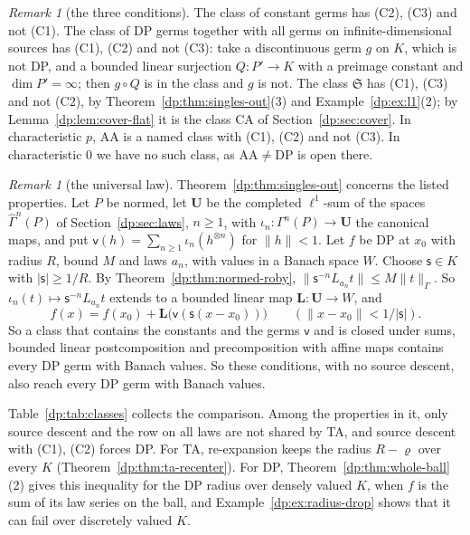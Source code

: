 \documentclass[11pt]{amsart}
\theoremstyle{definition}
\theoremstyle{remark}
\newtheorem{remark}[theorem]{Remark}
\numberwithin{equation}{section}
\newcommand{\abs}[1]{\lvert #1\rvert}
\newcommand{\norm}[1]{\lVert #1\rVert}
\theoremstyle{plain}
\theoremstyle{definition}
\theoremstyle{plain}
\newcommand{\hGamma}{\widehat\Gamma}
\begin{document}
\begin{remark}[the three conditions]\label{dp:rem:conditions}
The class of constant germs has (C2), (C3) and not (C1). The class of DP germs together with all germs on infinite-dimensional sources has (C1), (C2) and not (C3): take a discontinuous germ $g$ on $K$, which is not DP, and a bounded linear surjection $Q\colon P'\to K$ with a preimage constant and $\dim P'=\infty$; then $g\circ Q$ is in the class and $g$ is not. The class $\mathfrak S$ has (C1), (C3) and not (C2), by Theorem~\ref{dp:thm:singles-out}(3) and Example~\ref{dp:ex:l1}(2); by Lemma~\ref{dp:lem:cover-flat} it is the class CA of Section~\ref{dp:sec:cover}. In characteristic $p$, AA is a named class with (C1), (C2) and not (C3). In characteristic $0$ we have no such class, as $\mathrm{AA}\ne\mathrm{DP}$ is open there.
\end{remark}

\begin{remark}[the universal law]\label{dp:rem:universal-law}
Theorem~\ref{dp:thm:singles-out} concerns the listed properties. Let $P$ be normed, let $\mathbf U$ be the completed $\ell^1$-sum of the spaces $\hGamma^n(P)$ of Section~\ref{dp:sec:laws}, $n\ge1$, with $\iota_n\colon\Gamma^n(P)\to\mathbf U$ the canonical maps, and put $\mathsf v(h)=\sum_{n\ge1}\iota_n(h^{\otimes n})$ for $\norm h<1$. Let $f$ be DP at $x_0$ with radius $R$, bound $M$ and laws $a_n$, with values in a Banach space $W$. Choose $\mathsf s\in K$ with $\abs{\mathsf s}\ge1/R$. By Theorem~\ref{dp:thm:normed-roby}, $\norm{\mathsf s^{-n}L_{a_n}t}\le M\norm t_\Gamma$. So $\iota_n(t)\mapsto\mathsf s^{-n}L_{a_n}t$ extends to a bounded linear map $\mathbf L\colon\mathbf U\to W$, and
\[
 f(x)=f(x_0)+\mathbf L\bigl(\mathsf v(\mathsf s(x-x_0))\bigr)\qquad(\norm{x-x_0}<1/\abs{\mathsf s}).
\]
So a class that contains the constants and the germs $\mathsf v$ and is closed under sums, bounded linear postcomposition and precomposition with affine maps contains every DP germ with Banach values. So these conditions, with no source descent, also reach every DP germ with Banach values.
\end{remark}

Table~\ref{dp:tab:classes} collects the comparison. Among the properties in it, only source descent and the row on all laws are not shared by TA, and source descent with (C1), (C2) forces DP. For TA, re-expansion keeps the radius $R-\varrho$ over every $K$ (Theorem~\ref{dp:thm:ta-recenter}). For DP, Theorem~\ref{dp:thm:whole-ball}(2) gives this inequality for the DP radius over densely valued $K$, when $f$ is the sum of its law series on the ball, and Example~\ref{dp:ex:radius-drop} shows that it can fail over discretely valued $K$.
\end{document}
